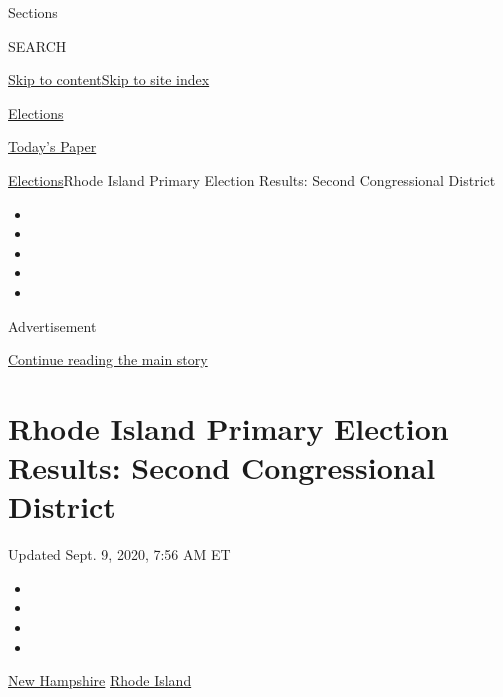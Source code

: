 Sections

SEARCH

\protect\hyperlink{site-content}{Skip to
content}\protect\hyperlink{site-index}{Skip to site index}

\href{https://www.nytimes3xbfgragh.onion/news-event/2020-election}{Elections}

\href{https://myaccount.nytimes3xbfgragh.onion/auth/login?response_type=cookie\&client_id=vi}{}

\href{https://www.nytimes3xbfgragh.onion/section/todayspaper}{Today's
Paper}

\href{/news-event/2020-election}{Elections}\textbar{}Rhode Island
Primary Election Results: Second Congressional District

\begin{itemize}
\item
\item
\item
\item
\item
\end{itemize}

Advertisement

\protect\hyperlink{after-top}{Continue reading the main story}

\hypertarget{rhode-island-primary-election-results-second-congressional-district}{%
\section{Rhode Island Primary Election Results: Second Congressional
District}\label{rhode-island-primary-election-results-second-congressional-district}}

Updated Sept. 9, 2020, 7:56 AM ET

\begin{itemize}
\item
\item
\item
\item
\end{itemize}

\href{https://www.nytimes3xbfgragh.onion/interactive/2020/09/08/us/elections/results-new-hampshire-primary-elections.html?action=click\&module=ELEX_results\&pgtype=Interactive\&region=Navigation}{New
Hampshire}
\href{https://www.nytimes3xbfgragh.onion/interactive/2020/09/08/us/elections/results-rhode-island-primary-elections.html?action=click\&module=ELEX_results\&pgtype=Interactive\&region=Navigation}{Rhode
Island}

